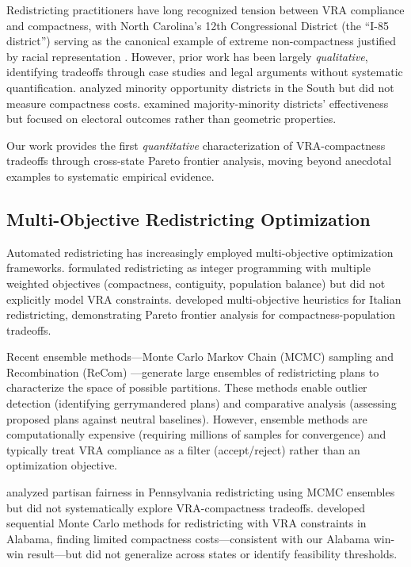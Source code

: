 Redistricting practitioners have long recognized tension between VRA compliance and compactness, with North Carolina's 12th Congressional District (the ``I-85 district'') serving as the canonical example of extreme non-compactness justified by racial representation \citep{pildes1993}. However, prior work has been largely \emph{qualitative}, identifying tradeoffs through case studies and legal arguments without systematic quantification. \citet{rush1995} analyzed minority opportunity districts in the South but did not measure compactness costs. \citet{lublin1997} examined majority-minority districts' effectiveness but focused on electoral outcomes rather than geometric properties.

Our work provides the first \emph{quantitative} characterization of VRA-compactness tradeoffs through cross-state Pareto frontier analysis, moving beyond anecdotal examples to systematic empirical evidence.

\subsection{Multi-Objective Redistricting Optimization}

Automated redistricting has increasingly employed multi-objective optimization frameworks. \citet{mehrotra1998} formulated redistricting as integer programming with multiple weighted objectives (compactness, contiguity, population balance) but did not explicitly model VRA constraints. \citet{ricca2013} developed multi-objective heuristics for Italian redistricting, demonstrating Pareto frontier analysis for compactness-population tradeoffs.

Recent ensemble methods---Monte Carlo Markov Chain (MCMC) sampling \citep{deford2021} and Recombination (ReCom) \citep{deford2019}---generate large ensembles of redistricting plans to characterize the space of possible partitions. These methods enable outlier detection (identifying gerrymandered plans) and comparative analysis (assessing proposed plans against neutral baselines). However, ensemble methods are computationally expensive (requiring millions of samples for convergence) and typically treat VRA compliance as a filter (accept/reject) rather than an optimization objective.

\citet{deford2021} analyzed partisan fairness in Pennsylvania redistricting using MCMC ensembles but did not systematically explore VRA-compactness tradeoffs. \citet{mccartan2020} developed sequential Monte Carlo methods for redistricting with VRA constraints in Alabama, finding limited compactness costs---consistent with our Alabama win-win result---but did not generalize across states or identify feasibility thresholds.

